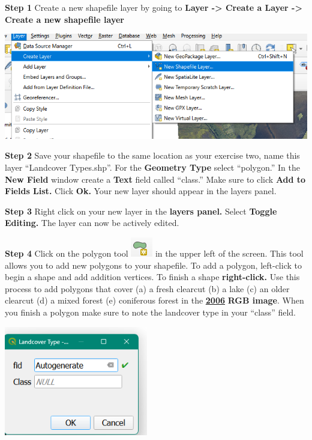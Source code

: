 \documentclass[
  letterpaper,
]{book}
\begin{document}
\textbf{Step 1} Create a new shapefile layer by going to \textbf{Layer
-\textgreater{} Create a Layer -\textgreater{} Create a new shapefile
layer}

\includegraphics{images/clipboard-477174409.png}

\textbf{Step 2} Save your shapefile to the same location as your
exercise two, name this layer ``Landcover Types.shp''. For the
\textbf{Geometry Type} select ``polygon.'' In the \textbf{New Field}
window create a \textbf{Text} field called ``class.'' Make sure to click
\textbf{Add to Fields List.} Click \textbf{Ok.} Your new layer should
appear in the layers panel.

\textbf{Step 3} Right click on your new layer in the \textbf{layers
panel.} Select \textbf{Toggle Editing.} The layer can now be actively
edited.

\textbf{Step 4} Click on the polygon tool
\includegraphics{images/clipboard-3885190170.png} in the upper left of
the screen. This tool allows you to add new polygons to your shapefile.
To add a polygon, left-click to begin a shape and add addition vertices.
To finish a shape \textbf{right-click.} Use this process to add polygons
that cover (a) a fresh clearcut (b) a lake (c) an older clearcut (d) a
mixed forest (e) coniferous forest in the \ul{\textbf{2006}} \textbf{RGB
image}. When you finish a polygon make sure to note the landcover type
in your ``class'' field.

\includegraphics[width=2.46875in,height=\textheight]{images/clipboard-1460819033.png}
\end{document}
